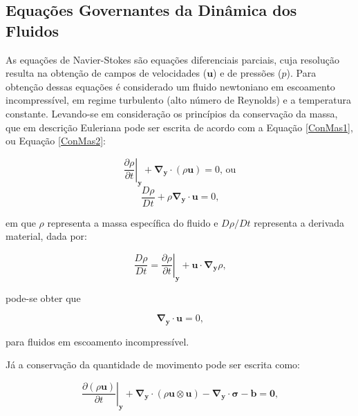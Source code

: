 \documentclass[_ArquivoPrincipal.tex]{subfiles}
\begin{document}
\subsection{Equações Governantes da Dinâmica dos Fluidos} \label{EqGov}

As equações de Navier-Stokes são equações diferenciais parciais, cuja resolução resulta na obtenção de campos de velocidades ($\mathbf{u}$) e de pressões ($p$). Para obtenção dessas equações é considerado um fluido newtoniano em escoamento incompressível, em regime turbulento (alto número de Reynolds) e a temperatura constante. Levando-se em consideração os princípios da conservação da massa, que em descrição Euleriana pode ser escrita de acordo com a Equação \ref{ConMas1}, ou Equação \ref{ConMas2}:

\begin{equation}
    \left.\frac{\partial\rho}{\partial t}\right|_{\mathbf{y}}+\mathbf{\nabla}_\mathbf{y}\cdot(\rho\mathbf{u})=0\text{, ou}
    \label{ConMas1}
\end{equation}
\begin{equation}
    \frac{D\rho}{Dt}+\rho\mathbf{\nabla}_\mathbf{y}\cdot\mathbf{u}=0\text{,}
    \label{ConMas2}
\end{equation}

\noindent em que $\rho$ representa a massa específica do fluido e $D\rho/Dt$ representa a derivada material, dada por:

\begin{equation}
    \frac{D\rho}{Dt}=\left.\frac{\partial\rho}{\partial t}\right|_\mathbf{y}+\mathbf{u}\cdot\mathbf{\nabla}_\mathbf{y}\rho\text{,}
    \label{DerMat}
\end{equation}

\noindent pode-se obter que 

\begin{equation}
    \mathbf{\nabla}_\mathbf{y}\cdot\mathbf{u}=0\text{,}
    \label{Divu0}
\end{equation}

\noindent para fluidos em escoamento incompressível.

Já a conservação da quantidade de movimento pode ser escrita como:

\begin{equation}
    \left.\frac{\partial(\rho\mathbf{u})}{\partial t}\right|_\mathbf{y}+\mathbf{\nabla}_\mathbf{y}\cdot(\rho\mathbf{u}\otimes\mathbf{u})-\mathbf{\nabla}_\mathbf{y}\cdot\mathbf{\sigma}-\mathbf{b}=\mathbf{0}\text{,}
    \label{ConQuantMov}
\end{equation}
\end{document}
